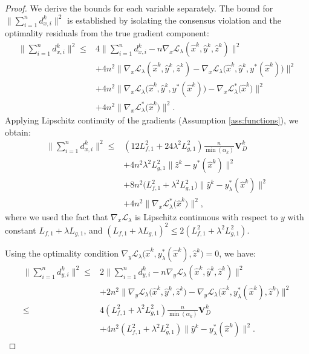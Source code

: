 \documentclass{article}
\theoremstyle{plain}
\theoremstyle{definition}
\theoremstyle{remark}
\begin{document}
\begin{proof}
    We derive the bounds for each variable separately.
    The bound for $\bigg\|\sum_{i=1}^nd_{x,i}^k\bigg\|^{2}$ is established by isolating the consensus violation and the optimality residuals from the true gradient component:
    \begin{align*}
        \bigg\|\sum_{i=1}^nd_{x,i}^k\bigg\|^{2}
        \leq{}& 4 \bigg\| \sum_{i=1}^n d_{x,i}^k - n \nabla_{x} \mathcal{L}_{\lambda}({\hat{x}}^k, {\hat{y}}^k, {\hat{z}}^k) \bigg\|^{2} \\
        &+ 4 n^{2}\big\| \nabla_{x} \mathcal{L}_{\lambda}({\hat{x}}^k, {\hat{y}}^k, {\hat{z}}^k) - \nabla_{x} \mathcal{L}_{\lambda}\big({\hat{x}}^k, {\hat{y}}^k, y^*({\hat{x}}^k)\big) \big\|^{2} \\
        &+ 4 n^{2} \big\| \nabla_{x} \mathcal{L}_{\lambda}\big({\hat{x}}^k, {\hat{y}}^k, y^*({\hat{x}}^k)\big) - \nabla_{x} \mathcal{L}_{\lambda}^{*}\big({\hat{x}}^k\big) \big\|^{2} \\
        &+ 4n^{2}\big\| \nabla_{x} \mathcal{L}_{\lambda}^{*}\big({\hat{x}}^k\big) \big\|^{2}.
    \end{align*}
    Applying Lipschitz continuity of the gradients (Assumption \ref{ass:functions}), we obtain:
    \begin{align*}
        \bigg\|\sum_{i=1}^nd_{x,i}^k\bigg\|^{2} \leq{}& (12 L_{f,1}^{2} + 24 \lambda^{2}L_{g,1}^{2})\frac{n}{\min(\alpha_{k})}\mathbf{V}_{D}^{k} \\
        &+ 4 n^{2}\lambda^{2}L_{g,1}^{2}\big\|\hat{z}^{k}-y^*(\hat{x}^{k})\big\|^{2} \\
        &+ 8 n^{2}\big(L_{f,1}^{2}+\lambda^{2}L_{g,1}^{2}\big)\big\|\hat{y}^{k}-y_{\lambda}^*(\hat{x}^{k})\big\|^{2} \\
        &+ 4n^{2}\big\| \nabla_{x} \mathcal{L}_{\lambda}^{*}\big({\hat{x}}^k\big) \big\|^{2},
    \end{align*}
    where we used the fact that $\nabla_x \mathcal{L}_\lambda$ is Lipschitz continuous with respect to $y$ with constant $L_{f,1} + \lambda L_{g,1}$, and $(L_{f,1} + \lambda L_{g,1})^2 \leq 2(L_{f,1}^2 + \lambda^2 L_{g,1}^2)$.

 Using the optimality condition $\nabla_{y} \mathcal{L}_{\lambda}\big({\hat{x}}^k, y_{\lambda}^{*}({\hat{x}}^k),{\hat{z}}^k\big) = 0$, we have:
    \begin{align*}
        \bigg\|\sum_{i=1}^nd_{y,i}^k\bigg\|^{2}
        \leq{}& 2 \bigg\| \sum_{i=1}^nd_{y,i}^k- n \nabla_{y} \mathcal{L}_{\lambda}({\hat{x}}^k, {\hat{y}}^k, {\hat{z}}^k) \bigg\|^{2} \\
        &+ 2n^{2} \big\| \nabla_{y} \mathcal{L}_{\lambda}\big({\hat{x}}^k, {\hat{y}}^k, {\hat{z}}^k\big) - \nabla_{y} \mathcal{L}_{\lambda}\big({\hat{x}}^k, y_{\lambda}^{*}({\hat{x}}^k),{\hat{z}}^k\big) \big\|^{2} \\
        \leq{}& 4 (L_{f,1}^{2}+\lambda^{2} L_{g,1}^{2})\frac{n}{\min(\alpha_{k})}\mathbf{V}_{D}^{k} \\
        &+ 4 n^{2} (L_{f,1}^{2}+\lambda^{2} L_{g,1}^{2})\big\|\hat{y}^{k}-y_{\lambda}^*(\hat{x}^{k})\big\|^{2}.
    \end{align*}


\end{proof}
\end{document}
